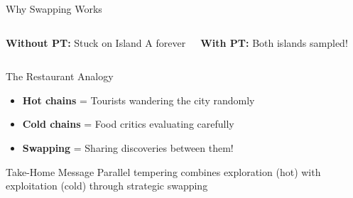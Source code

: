 \documentclass[aspectratio=169]{beamer}
\begin{document}
\begin{frame}{Why Swapping Works}
\begin{columns}
\vspace{0.2cm}
\textbf{Without PT:} Stuck on Island A forever

\textbf{With PT:} Both islands sampled!
\end{columns}

\vspace{0.3cm}

\begin{block}{The Restaurant Analogy}
\begin{itemize}
\item \textbf{Hot chains} = Tourists wandering the city randomly
\item \textbf{Cold chains} = Food critics evaluating carefully
\item \textbf{Swapping} = Sharing discoveries between them!
\end{itemize}
\end{block}

\begin{alertblock}{Take-Home Message}
Parallel tempering combines exploration (hot) with exploitation (cold) through strategic swapping
\end{alertblock}

\end{frame}
\end{document}
